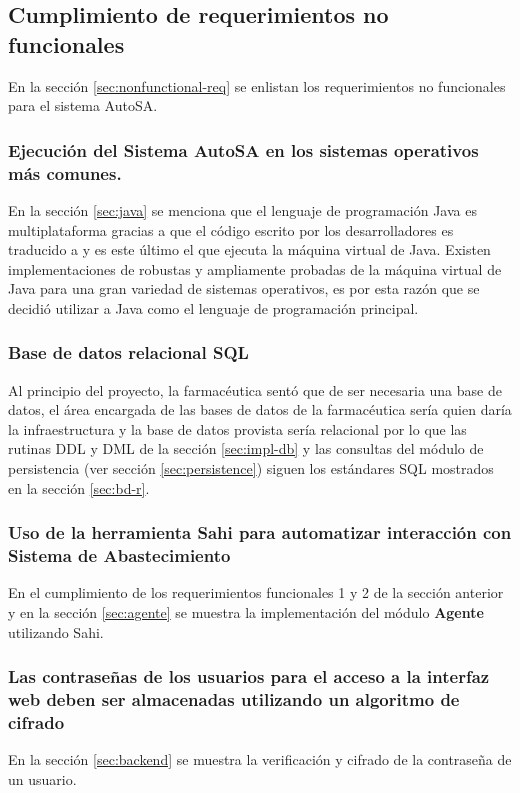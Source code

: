 \subsection{Cumplimiento de requerimientos no funcionales}
En la sección \ref{sec:nonfunctional-req} se enlistan los requerimientos no funcionales para el sistema AutoSA.

\subsubsection{Ejecución del Sistema AutoSA en los sistemas operativos más comunes.}
En la sección \ref{sec:java} se menciona que el lenguaje de programación Java es multiplataforma gracias a que el código escrito por los desarrolladores es traducido a  y es este último el que ejecuta la máquina virtual de Java. Existen implementaciones de robustas y ampliamente probadas de la máquina virtual de Java para una gran variedad de sistemas operativos, es por esta razón que se decidió utilizar a Java como el lenguaje de programación principal.

\subsubsection{Base de datos relacional SQL}
Al principio del proyecto, la farmacéutica sentó que de ser necesaria una base de datos, el área encargada de las bases de datos de la farmacéutica sería quien daría la infraestructura y la base de datos provista sería relacional por lo que las rutinas DDL y DML de la sección \ref{sec:impl-db} y las consultas del módulo de persistencia (ver sección \ref{sec:persistence}) siguen los estándares SQL mostrados en la sección \ref{sec:bd-r}.

\subsubsection{Uso de la herramienta Sahi para automatizar interacción con Sistema de Abastecimiento}
En el cumplimiento de los requerimientos funcionales 1 y 2 de la sección anterior y en la sección \ref{sec:agente} se muestra la implementación del módulo \textbf{Agente} utilizando Sahi.

\subsubsection{Las contraseñas de los usuarios para el acceso a la interfaz web deben ser almacenadas utilizando un algoritmo de cifrado}
En la sección \ref{sec:backend} se muestra la verificación y cifrado de la contraseña de un usuario.
